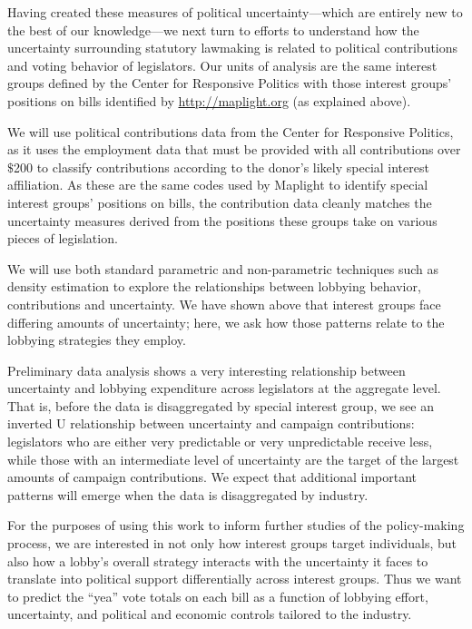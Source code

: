 \documentclass[12pt]{article}
\begin{document}
Having created these measures of political uncertainty---which are entirely new to the best of our knowledge---we next turn to efforts to understand how the uncertainty surrounding statutory lawmaking is related to political contributions and voting behavior of legislators. Our units of analysis are the same interest groups defined by the Center for Responsive Politics with those interest groups' positions on bills identified by \url{http://maplight.org} (as explained above).

We will use political contributions data from the Center for Responsive Politics, as it uses the employment data that must be provided with all contributions over $\$$200 to classify contributions according to the donor's likely special interest affiliation. As these are the same codes used by Maplight to identify special interest groups' positions on bills, the contribution data cleanly matches the uncertainty measures derived from the positions these groups take on various pieces of legislation.

We will use both standard parametric and non-parametric techniques such as density estimation to explore the relationships between lobbying behavior, contributions and uncertainty. We have shown above that interest groups face differing amounts of uncertainty; here, we ask how those patterns relate to the lobbying strategies they employ.

Preliminary data analysis shows a very interesting relationship between uncertainty and lobbying expenditure across legislators at the aggregate level. That is, before the data is disaggregated by special interest group, we see an inverted U relationship between uncertainty and campaign contributions: legislators who are either very predictable or very unpredictable receive less, while those with an intermediate level of uncertainty are the target of the largest amounts of campaign contributions. We expect that additional important patterns will emerge when the data is disaggregated by industry.

For the purposes of using this work to inform further studies of the policy-making process, we are interested in not only how interest groups target individuals, but also how a lobby's overall strategy interacts with the uncertainty it faces to translate into political support differentially across interest groups. Thus we want to predict the ``yea'' vote totals on each bill as a function of lobbying effort, uncertainty, and political and economic controls tailored to the industry.
\end{document}
